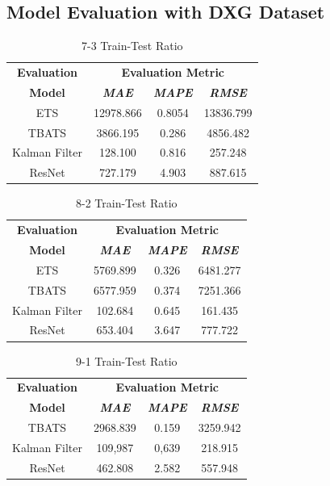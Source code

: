 \documentclass[conference]{IEEEtran}
\begin{document}
\newpage

\subsection{Model Evaluation with DXG Dataset}

\begin{table}[htbp]
\caption{7-3 Train-Test Ratio}
\begin{center}
\begin{tabular}{|c|c|c|c|}
\hline
\textbf{Evaluation}&\multicolumn{3}{|c|}{\textbf{Evaluation Metric}} \\
\cline{2-4}
\textbf{Model} & \textbf{\textit{MAE}}& \textbf{\textit{MAPE}}& \textbf{\textit{RMSE}} \\
\hline
ETS & 12978.866 & 0.8054 & 13836.799\\
\hline
TBATS & 3866.195 & 0.286 & 4856.482\\
\hline
Kalman Filter & 128.100 & 0.816 & 257.248\\
\hline
ResNet & 727.179 & 4.903 & 887.615\\
\hline
\end{tabular}
\label{tab1}
\end{center}
\end{table}

\begin{table}[htbp]
\caption{8-2 Train-Test Ratio}
\begin{center}
\begin{tabular}{|c|c|c|c|}
\hline
\textbf{Evaluation}&\multicolumn{3}{|c|}{\textbf{Evaluation Metric}} \\
\cline{2-4}
\textbf{Model} & \textbf{\textit{MAE}}& \textbf{\textit{MAPE}}& \textbf{\textit{RMSE}} \\
\hline
ETS & 5769.899 & 0.326 & 6481.277\\
\hline
TBATS & 6577.959 & 0.374 & 7251.366\\
\hline
Kalman Filter & 102.684 & 0.645 & 161.435\\
\hline
ResNet & 653.404 & 3.647 & 777.722\\
\hline
\end{tabular}
\label{tab1}
\end{center}
\end{table}

\begin{table}[htbp]
\caption{9-1 Train-Test Ratio}
\begin{center}
\begin{tabular}{|c|c|c|c|}
\hline
\textbf{Evaluation}&\multicolumn{3}{|c|}{\textbf{Evaluation Metric}} \\
\cline{2-4}
\textbf{Model} & \textbf{\textit{MAE}}& \textbf{\textit{MAPE}}& \textbf{\textit{RMSE}} \\
\hline
TBATS & 2968.839 & 0.159 & 3259.942\\
\hline
Kalman Filter & 109,987 & 0,639 & 218.915\\
\hline
ResNet & 462.808 & 2.582 & 557.948\\
\hline
\end{tabular}
\label{tab1}
\end{center}
\end{table}
\end{document}
